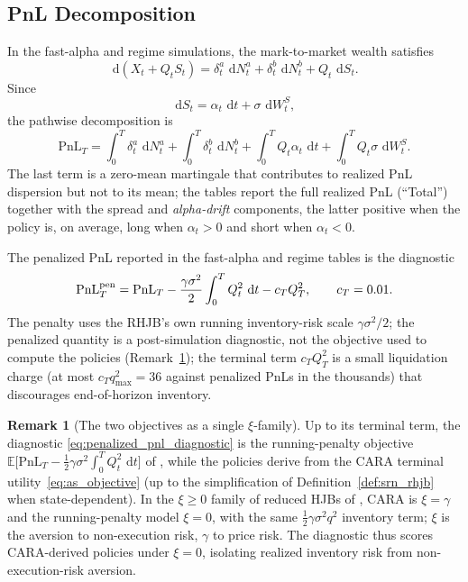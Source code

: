 \documentclass[11pt,a4paper]{article}
\newcommand{\E}{\mathbb{E}}
\newcommand{\dd}{\,\mathrm{d}}
\newcommand{\PnL}{\mathrm{PnL}}
\theoremstyle{plain}
\theoremstyle{definition}
\newtheorem{remark}{Remark}[section]
\begin{document}
\subsection{PnL Decomposition}

In the fast-alpha and regime simulations, the mark-to-market wealth satisfies
\[
\dd(X_t+Q_tS_t)
=
\delta_t^a\,\dd N_t^a
+\delta_t^b\,\dd N_t^b
+Q_t\,\dd S_t.
\]
Since
\[
\dd S_t=\alpha_t\,\dd t+\sigma\,\dd W^S_t,
\]
the pathwise decomposition is
\begin{equation}
\PnL_T
=
\int_0^T\delta_t^a\,\dd N_t^a
+\int_0^T\delta_t^b\,\dd N_t^b
+\int_0^T Q_t\alpha_t\,\dd t
+\int_0^T Q_t\sigma\,\dd W^S_t.
\label{eq:pnl_decomposition}
\end{equation}
The last term is a zero-mean martingale that contributes to realized PnL
dispersion but not to its mean; the tables report the full realized PnL
(``Total'') together with the spread and \emph{alpha-drift} components, the
latter positive when the policy is, on average, long when \(\alpha_t>0\) and
short when \(\alpha_t<0\).

The penalized PnL reported in the fast-alpha and regime tables is the
diagnostic
\begin{equation}
\PnL_T^{\rm pen}
=
\PnL_T
-\frac{\gamma\sigma^2}{2}\int_0^T Q_t^2\,\dd t
-c_T Q_T^2,
\qquad
c_T=0.01.
\label{eq:penalized_pnl_diagnostic}
\end{equation}
The penalty uses the RHJB's own running inventory-risk scale
\(\gamma\sigma^2/2\); the penalized quantity is a post-simulation diagnostic,
not the objective used to compute the policies (Remark~\ref{rem:xi}); the
terminal term \(c_TQ_T^2\) is a small liquidation charge (at most
\(c_Tq_{\max}^2=36\) against penalized PnLs in the thousands) that
discourages end-of-horizon inventory.

\begin{remark}[The two objectives as a single $\xi$-family]
\label{rem:xi}
Up to its terminal term, the diagnostic \eqref{eq:penalized_pnl_diagnostic} is
the running-penalty objective
\(\E\bigl[\PnL_T-\tfrac12\gamma\sigma^2\int_0^TQ_t^2\,\dd t\bigr]\) of
\cite{CarteaJaimungalPenalva2015}, while the policies derive from the CARA
terminal utility~\eqref{eq:as_objective} (up to the simplification of
Definition~\ref{def:srn_rhjb} when state-dependent).  In the \(\xi\ge0\)
family of reduced HJBs of \cite{Gueant2017}, CARA is \(\xi=\gamma\) and the
running-penalty model \(\xi=0\), with the same \(\tfrac12\gamma\sigma^2q^2\)
inventory term; \(\xi\) is the aversion to non-execution risk, \(\gamma\) to
price risk.  The diagnostic thus scores CARA-derived policies under
\(\xi=0\), isolating realized inventory risk from non-execution-risk aversion.
\end{remark}
\end{document}

